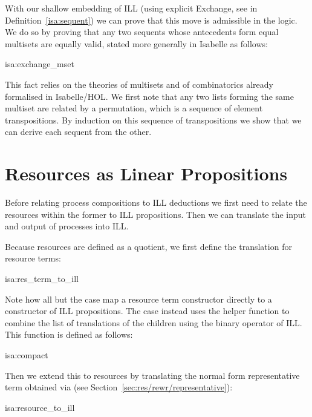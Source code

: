 \documentclass[class=smolathesis,crop=false]{standalone}
\begin{document}
With our shallow embedding of ILL (using explicit Exchange, see  in Definition~\ref{isa:sequent}) we can prove that this move is admissible in the logic.
We do so by proving that any two sequents whose antecedents form equal multisets are equally valid, stated more generally in Isabelle as follows:
\begin{isalemma}{isa:exchange_mset}
  
\end{isalemma}

This fact relies on the theories of multisets and of combinatorics already formalised in Isabelle/HOL\@.
We first note that any two lists forming the same multiset are related by a permutation, which is a sequence of element transpositions.
By induction on this sequence of transpositions we show that we can derive each sequent from the other.

\section{Resources as Linear Propositions}
\label{sec:linearity/res}

Before relating process compositions to ILL deductions we first need to relate the resources within the former to ILL propositions.
Then we can translate the input and output of processes into ILL\@.

Because resources are defined as a quotient, we first define the translation for resource terms:
\begin{isadef}{isa:res_term_to_ill}
  
\end{isadef}

Note how all but the  case map a resource term constructor directly to a constructor of ILL propositions.
The  case instead uses the helper function  to combine the list of translations of the children using the binary \isa{\isasymotimes} operator of ILL\@.
This function is defined as follows:
\begin{isadef}{isa:compact}
  
\end{isadef}

Then we extend this to resources by translating the normal form representative term obtained via  (see Section~\ref{sec:res/rewr/representative}):
\begin{isadef}{isa:resource_to_ill}
  
\end{isadef}
\end{document}
